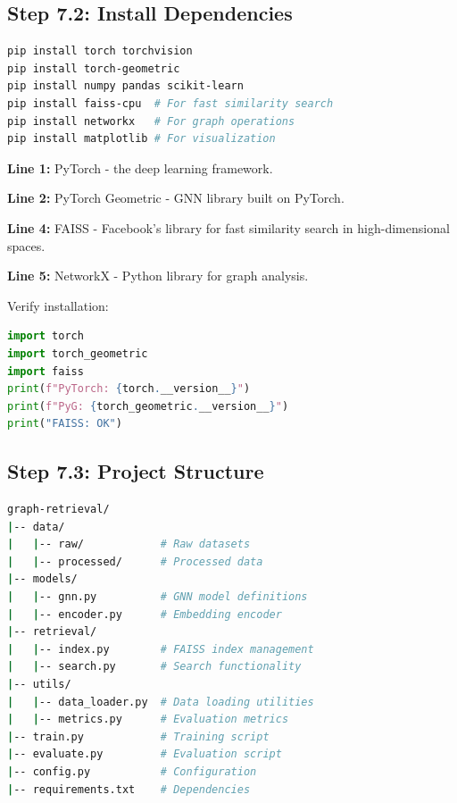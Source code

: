 \documentclass[12pt,a4paper]{article}
\begin{document}
\subsection{Step 7.2: Install Dependencies}

\begin{lstlisting}[language=bash,caption={Install packages}]
pip install torch torchvision
pip install torch-geometric
pip install numpy pandas scikit-learn
pip install faiss-cpu  # For fast similarity search
pip install networkx   # For graph operations
pip install matplotlib # For visualization
\end{lstlisting}

\begin{explanation}
\textbf{Line 1:} PyTorch - the deep learning framework.

\textbf{Line 2:} PyTorch Geometric - GNN library built on PyTorch.

\textbf{Line 4:} FAISS - Facebook's library for fast similarity search in high-dimensional spaces.

\textbf{Line 5:} NetworkX - Python library for graph analysis.
\end{explanation}

\begin{checkpoint}
Verify installation:
\begin{lstlisting}[language=Python]
import torch
import torch_geometric
import faiss
print(f"PyTorch: {torch.__version__}")
print(f"PyG: {torch_geometric.__version__}")
print("FAISS: OK")
\end{lstlisting}
\end{checkpoint}

\subsection{Step 7.3: Project Structure}

\begin{lstlisting}[language=bash,caption={Directory structure}]
graph-retrieval/
|-- data/
|   |-- raw/            # Raw datasets
|   |-- processed/      # Processed data
|-- models/
|   |-- gnn.py          # GNN model definitions
|   |-- encoder.py      # Embedding encoder
|-- retrieval/
|   |-- index.py        # FAISS index management
|   |-- search.py       # Search functionality
|-- utils/
|   |-- data_loader.py  # Data loading utilities
|   |-- metrics.py      # Evaluation metrics
|-- train.py            # Training script
|-- evaluate.py         # Evaluation script
|-- config.py           # Configuration
|-- requirements.txt    # Dependencies
\end{lstlisting}
\end{document}
